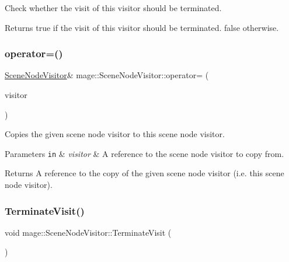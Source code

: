 Check whether the visit of this visitor should be terminated.

\begin{DoxyReturn}{Returns}
{\ttfamily true} if the visit of this visitor should be terminated. {\ttfamily false} otherwise. 
\end{DoxyReturn}
\hypertarget{classmage_1_1_scene_node_visitor_a4e3c71d7df6c589a81dffd5d8d285c1d}{}\label{classmage_1_1_scene_node_visitor_a4e3c71d7df6c589a81dffd5d8d285c1d} 
\subsubsection{\texorpdfstring{operator=()}{operator=()}}
{\footnotesize\ttfamily \hyperlink{classmage_1_1_scene_node_visitor}{Scene\+Node\+Visitor}\& mage\+::\+Scene\+Node\+Visitor\+::operator= (\begin{DoxyParamCaption}\item[{const \hyperlink{classmage_1_1_scene_node_visitor}{Scene\+Node\+Visitor} \&}]{visitor }\end{DoxyParamCaption})\hspace{0.3cm}{\ttfamily [protected]}}

Copies the given scene node visitor to this scene node visitor.


\begin{DoxyParams}[1]{Parameters}
\mbox{\tt in}  & {\em visitor} & A reference to the scene node visitor to copy from. \\
\hline
\end{DoxyParams}
\begin{DoxyReturn}{Returns}
A reference to the copy of the given scene node visitor (i.\+e. this scene node visitor). 
\end{DoxyReturn}
\hypertarget{classmage_1_1_scene_node_visitor_a8fe1b3469cbb97d4086cb030128fa28c}{}\label{classmage_1_1_scene_node_visitor_a8fe1b3469cbb97d4086cb030128fa28c} 
\subsubsection{\texorpdfstring{Terminate\+Visit()}{TerminateVisit()}}
{\footnotesize\ttfamily void mage\+::\+Scene\+Node\+Visitor\+::\+Terminate\+Visit (\begin{DoxyParamCaption}{ }\end{DoxyParamCaption})\hspace{0.3cm}{\ttfamily [protected]}}

